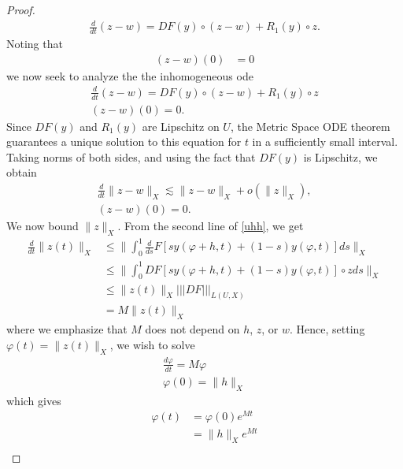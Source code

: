 \documentclass[12pt,reqno]{amsart}
\numberwithin{equation}{section}  %
\newcommand{\vp}{\varphi}
\begin{document}
\begin{proof}
\begin{equation*}
\begin{split}
  \frac{d}{dt}(z-w) = DF(y) \circ (z-w) + R_{1}(y) \circ z.
\end{split}
\end{equation*}
%
%
Noting that %
%
\begin{equation*}
\begin{split}
  (z-w)(0) & = 0
\end{split}
\end{equation*}
%
%
we now seek to analyze the the inhomogeneous ode
%
%
\begin{gather}
  \frac{d}{dt}(z-w)  = DF(y) \circ (z-w) + R_{1}(y) \circ z
\label{inhom-ode}
  \\
  (z-w)(0) = 0.
  \label{inhom-ode-init}
\end{gather}
%
Since $DF(y)$ and $R_{1}(y)$ are Lipschitz on $U$, the Metric Space ODE theorem
guarantees a unique solution to this equation for $t$ in a sufficiently small
interval. Taking norms of both sides, and using the fact that $DF(y)$ is
Lipschitz, we obtain
%
%
%
%
\begin{gather}
    \label{yt}
    \frac{d}{dt} \| z - w \|_{X} \lesssim  \| z - w \|_{X}  + o(\|z\|_{X}),
    \\
    (z-w)(0) = 0.
    \label{ytt}
\end{gather}
%
We now bound $\| z \|_{X}$. From the
second line of \eqref{uhh}, we get
%
%
\begin{equation*}
\begin{split}
    \frac{d}{dt} \| z(t) \|_{X}
& \le \| \int_{0}^{1} \frac{d}{ds} F\left[ sy(\vp+h, t) + (1-s)y(\vp,t) \right]ds
\|_{X}
\\
& \le \| \int_{0}^{1} DF\left[  sy(\vp+h, t) + (1-s)y(\vp,t) \right] \circ z ds
\|_{X}
\\
& \le \| z(t) \|_{X} | | | DF | | |_{L(U, X)}
\\
& = M \| z(t) \|_{X}
\end{split}
\end{equation*}
%
where we emphasize that $M$ does not depend on $h$, $z$, or $w$.
Hence, setting $\vp(t) =  \| z(t) \|_{X}$, we wish to solve
%
%
\begin{gather*}
\frac{d \vp}{dt} = M \vp
\\
\vp(0) = \| h \|_{X}
\end{gather*}
%
%
which gives
%
%
\begin{equation*}
\begin{split}
  \vp(t) & = \vp(0)e^{Mt}
  \\
  & = \| h \|_{X} e^{Mt}
  \\

\end{split}
\end{equation*}
\end{proof}
\end{document}
